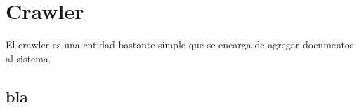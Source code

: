 \section{Crawler}
El crawler es una entidad bastante simple que se encarga de agregar documentos al sistema.

\subsection{bla}
